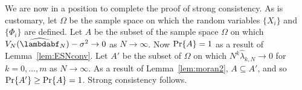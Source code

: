 \documentclass[journal]{IEEEtran}
\begin{document}
We are now in a position to complete the proof of strong consistency.  As is customary, let $\Omega$ be the sample space on which the random variables $\{X_i\}$ and $\{\Phi_i\}$ are defined.  Let $A$ be the subset of the sample space $\Omega$ on which  $V_N(\widehat{\lambdabf}_N) - \sigma^2 \rightarrow 0$ as $N\rightarrow\infty$.  Now $\operatorname{Pr}\{A\} =1$ as a result of Lemma~\ref{lem:ESNconv}.  Let $A'$ be the subset of $\Omega$ on which $N^k\widehat{\lambda}_{k,N} \rightarrow 0$ for $k=0,\dots,m$ as $N\rightarrow\infty$.  As a result of Lemma~\ref{lem:moran2}, $A \subseteq A'$, and so $\operatorname{Pr}\{A'\} \geq \operatorname{Pr}\{A\} = 1$.  Strong consistency follows.

\end{document}
